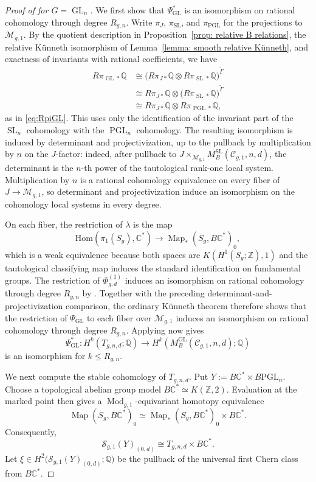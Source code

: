 \documentclass[11pt,reqno]{amsart}
\theoremstyle{plain} %
\theoremstyle{definition}
\newcommand{\QQ}{\mathbb{Q}}
\newcommand{\CC}{\mathbb{C}}
\newcommand{\Hom}{\mathrm{Hom}}
\newcommand{\M}{\mathcal{M}}
\newcommand{\C}{\mathcal{C}}
\newcommand{\ZZ}{\mathbb{Z}}
\DeclareMathOperator{\GL}{GL}
\DeclareMathOperator{\SL}{SL}
\DeclareMathOperator{\PGL}{PGL}
\newcommand{\BPGL}{B\mathrm{PGL}}
\DeclareMathOperator{\Mod}{Mod}
\DeclareMathOperator{\Map}{Map}
\newcommand{\Sc}{\mathcal{S}}
\begin{document}
\begin{proof}[Proof of  for $G=\GL_n$]
We first show that $\Psi_{\GL}^*$ is an isomorphism on rational cohomology through degree $R_{g,n}$. Write $\pi_J$, $\pi_{\SL}$, and $\pi_{\PGL}$ for the projections to $\M_{g,1}$. By the quotient description in Proposition~\ref{prop: relative B relations}, the relative K\"unneth isomorphism of Lemma~\ref{lemma: smooth relative Künneth}, and exactness of invariants with rational coefficients, we have
\begin{align*}
R\pi_{\GL *}\QQ
&\cong \big(R\pi_{J *}\QQ\otimes R\pi_{\SL *}\QQ\big)^{\widetilde\Gamma}\\
&\cong R\pi_{J *}\QQ\otimes \big(R\pi_{\SL *}\QQ\big)^{\widetilde\Gamma}\\
&\cong R\pi_{J *}\QQ\otimes R\pi_{\PGL *}\QQ,
\end{align*}
as in \eqref{eq:RpiGL}. This uses only the identification of the invariant part of the $\SL_n$ cohomology with the $\PGL_n$ cohomology. The resulting isomorphism is induced by determinant and projectivization, up to the pullback by multiplication by $n$ on the $J$-factor: indeed, after pullback to $J\times_{\M_{g,1}}M_B^{\SL}(\C_{g,1},n,d)$, the determinant is the $n$-th power of the tautological rank-one local system. Multiplication by $n$ is a rational cohomology equivalence on every fiber of $J\to\M_{g,1}$, so determinant and projectivization induce an isomorphism on the cohomology local systems in every degree.

On each fiber, the restriction of $\lambda$ is the map
\[
\Hom(\pi_1(S_g),\CC^*)\longrightarrow\Map_*(S_g,B\CC^*)_0,
\]
which is a weak equivalence because both spaces are $K(H^1(S_g;\ZZ),1)$ and the tautological classifying map induces the standard identification on fundamental groups. The restriction of $\Phi^{(1)}_{g,d}$ induces an isomorphism on rational cohomology through degree $R_{g,n}$ by . Together with the preceding determinant-and-projectivization comparison, the ordinary K\"unneth theorem therefore shows that the restriction of $\Psi_{\GL}$ to each fiber over $\M_{g,1}$ induces an isomorphism on rational cohomology through degree $R_{g,n}$. Applying  now gives
\[
\Psi_{\GL}^*\colon H^k(T_{g,n,d};\QQ)\longrightarrow H^k(M_B^{\GL}(\C_{g,1},n,d);\QQ)
\]
is an isomorphism for $k\leq R_{g,n}$.

We next compute the stable cohomology of $T_{g,n,d}$. Put $Y:=B\CC^*\times\BPGL_n$. Choose a topological abelian group model $B\CC^*\simeq K(\ZZ,2)$. Evaluation at the marked point then gives a $\Mod_{g,1}$-equivariant homotopy equivalence
\[
\Map(S_g,B\CC^*)_0
\simeq
\Map_*(S_g,B\CC^*)_0\times B\CC^*.
\]
Consequently,
\begin{equation}\label{eq: GL evaluation splitting}
\Sc_{g,1}(Y)_{(0,d)}\cong T_{g,n,d}\times B\CC^*.
\end{equation}
Let $\xi\in H^2\big(\Sc_{g,1}(Y)_{(0,d)};\QQ\big)$ be the pullback of the universal first Chern class from $B\CC^*$.


\end{proof}
\end{document}
